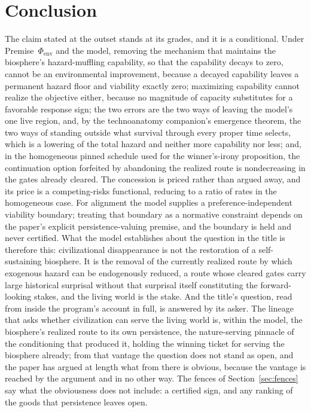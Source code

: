 \section{Conclusion}\label{sec:conclusion}

The claim stated at the outset stands at its grades, and it is a
conditional. Under Premise~$\Phi_{\mathrm{env}}$ and the model, removing
the mechanism that maintains the biosphere's hazard-muffling capability,
so that the capability decays to zero, cannot be an environmental
improvement, because a decayed capability leaves a permanent hazard
floor and viability exactly zero; maximizing capability cannot
realize the objective either, because no magnitude of capacity
substitutes for a favorable response sign; the two errors are the two
ways of leaving the model's one live region, and, by the technoanatomy
companion's emergence theorem, the two ways of standing outside what
survival through every proper time selects, which is a lowering of the
total hazard and neither more capability nor less; and, in the homogeneous
pinned schedule used for the winner's-irony proposition, the
continuation option forfeited by abandoning the realized route is
nondecreasing in the gates already cleared. The concession is priced rather
than argued away, and its price is a competing-risks functional,
reducing to a ratio of rates in the homogeneous case. For alignment the
model supplies a preference-independent viability boundary; treating
that boundary as a normative constraint depends on the paper's explicit
persistence-valuing premise, and the boundary is held and never
certified. What the model
establishes about the question in the title is therefore this:
civilizational disappearance is not the restoration of a
self-sustaining biosphere. It is the removal of the currently realized
route by which exogenous hazard can be endogenously reduced, a route
whose cleared gates carry large historical surprisal without that
surprisal itself constituting the forward-looking stakes, and the living
world is the stake. And the title's question, read from inside the
program's account in full, is answered by its asker. The lineage that asks
whether civilization can serve the living world is, within the model, the
biosphere's realized route to its own persistence, the nature-serving
pinnacle of the conditioning that produced it, holding the winning ticket
for serving the biosphere already; from that vantage the question does not
stand as open, and the paper has argued at length what from there is
obvious, because the vantage is reached by the argument and in no other
way. The fences of Section~\ref{sec:fences} say what the obviousness does
not include: a certified sign, and any ranking of the goods that
persistence leaves open.

\printbibliography
